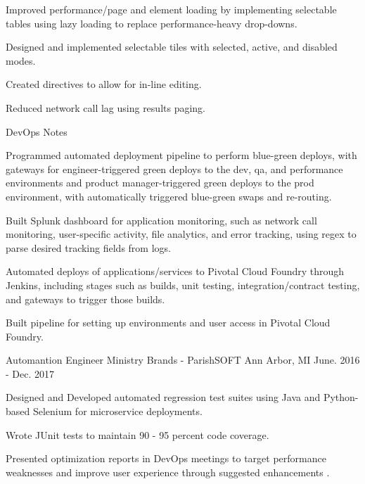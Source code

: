 \begin{cventries}
{\begin{cvitems}
\item {Improved performance/page and element loading by implementing selectable tables using lazy loading to replace performance-heavy drop-downs.}
\item {Designed and implemented selectable tiles with selected, active, and disabled modes.}
\item {Created directives to allow for in-line editing.}
\item {Reduced network call lag using results paging.}
\end{cvitems}
}
\vskip -0.5mm
\cventry
{DevOps Notes} {}{} {} %
{ %
\begin{cvitems}
\item {Programmed automated deployment pipeline to perform blue-green deploys, with gateways for engineer-triggered green deploys to the dev, qa, and performance environments and product manager-triggered green deploys to the prod environment, with automatically triggered blue-green swaps and re-routing.}
\item {Built Splunk dashboard for application monitoring, such as network call monitoring, user-specific activity, file analytics, and error tracking, using regex to parse desired tracking fields from logs.}
\item {Automated deploys of applications/services to Pivotal Cloud Foundry through Jenkins, including stages such as builds, unit testing, integration/contract testing, and gateways to trigger those builds.}
\item {Built pipeline for setting up environments and user access in Pivotal Cloud Foundry.}
\end{cvitems}
}


\vskip 2mm
\cventry
{Automantion Engineer} %
{Ministry Brands - ParishSOFT} %
{Ann Arbor, MI} %
{June. 2016 - Dec. 2017} %
{ %
\begin{cvitems}
\item {Designed and Developed automated regression test suites using Java and Python-based Selenium for microservice deployments.}
\item {Wrote JUnit tests to maintain 90 - 95 percent code coverage.}
\item {Presented optimization reports in DevOps meetings to target performance weaknesses and improve user experience through suggested enhancements
.}
\end{cvitems}
}


\end{cventries}
